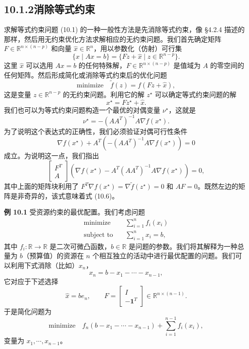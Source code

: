 \documentclass[UTF8, 12pt, fontset=fandol, oneside]{ctexart}
\begin{document}
\subsection*{10.1.2\quad 消除等式约束}

求解等式约束问题 (10.1) 的一种一般性方法是先消除等式约束，像 \S4.2.4 描述的那样，然后用无约束优化方法求解相应的无约束问题。我们首先确定矩阵 $F\in\mathbb{R}^{n\times(n-p)}$ 和向量 $\hat{x}\in\mathbb{R}^n$，用以参数化（仿射）可行集
\[
\{x\mid Ax=b\}=\{Fz+\hat{x}\mid z\in\mathbb{R}^{n-p}\}.
\]
这里 $\hat{x}$ 可以选用 $Ax=b$ 的任何特殊解，$F\in\mathbb{R}^{n\times(n-p)}$ 是值域为 $A$ 的零空间的任何矩阵。然后形成简化或消除等式约束后的优化问题
\begin{equation}
\text{minimize}\quad \tilde{f}(z)=f(Fz+\hat{x}),
\tag{10.5}
\end{equation}
这是变量 $z\in\mathbb{R}^{n-p}$ 的无约束问题。利用它的解 $z^\star$ 可以确定等式约束问题的解
\[
x^\star=Fz^\star+\hat{x}.
\]
我们也可以为等式约束问题构造一个最优的对偶变量 $\nu^\star$，这就是
\[
\nu^\star=-(AA^T)^{-1}A\nabla f(x^\star).
\]
为了说明这个表达式的正确性，我们必须验证对偶可行性条件
\begin{equation}
\nabla f(x^\star)+A^T\left(-(AA^T)^{-1}A\nabla f(x^\star)\right)=0
\tag{10.6}
\end{equation}
成立。为说明这一点，我们指出
\[
\begin{bmatrix}
F^T\\
A
\end{bmatrix}
\left(\nabla f(x^\star)-A^T(AA^T)^{-1}A\nabla f(x^\star)\right)=0,
\]
其中上面的矩阵块利用了 $F^T\nabla f(x^\star)=\nabla\tilde{f}(z^\star)=0$ 和 $AF=0$。既然左边的矩阵是非奇异的，该式意味着式 (10.6)。

\noindent\textbf{例 10.1}\quad
受资源约束的最优配置。我们考虑问题
\[
\begin{aligned}
\text{minimize}\quad & \sum_{i=1}^n f_i(x_i)\\
\text{subject to}\quad & \sum_{i=1}^n x_i=b,
\end{aligned}
\]
其中 $f_i:\mathbb{R}\to\mathbb{R}$ 是二次可微凸函数，$b\in\mathbb{R}$ 是问题的参数。我们将其解释为一种总量为 $b$（预算值）的资源在 $n$ 个相互独立的活动中进行最优配置的问题。我们可以利用下式消除（比如）$x_n$，
\[
x_n=b-x_1-\cdots-x_{n-1},
\]
它对应于下述选择
\[
\hat{x}=be_n,\qquad
F=
\begin{bmatrix}
I\\
-\mathbf{1}^T
\end{bmatrix}
\in\mathbb{R}^{n\times(n-1)}.
\]
于是简化问题为
\[
\text{minimize}\quad f_n(b-x_1-\cdots-x_{n-1})+\sum_{i=1}^{n-1}f_i(x_i),
\]
变量为 $x_1,\cdots,x_{n-1}$。
\end{document}
